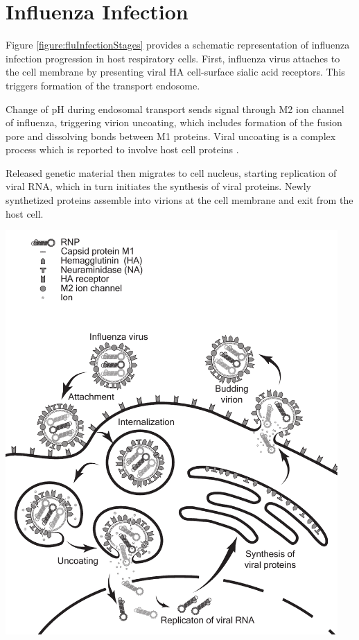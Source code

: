 \section{Influenza Infection}

Figure \ref{figure:fluInfectionStages} provides a schematic representation of influenza infection progression in host respiratory cells. First, influenza virus attaches to the cell membrane by presenting viral HA cell-surface sialic acid receptors. This triggers formation of the transport endosome.

Change of pH during endosomal transport sends signal through M2 ion channel of influenza, triggering virion uncoating, which includes formation of the fusion pore and dissolving bonds between M1 proteins. Viral uncoating is a complex process which is reported to involve host cell proteins \cite{banerjee2014influenza}.

Released genetic material then migrates to cell nucleus, starting replication of viral RNA, which in turn initiates the synthesis of viral proteins. Newly synthetized proteins assemble into virions at the cell membrane and exit from the host cell.

\begin{center}
\includegraphics[width=0.95\textwidth, trim={0cm 0cm 0cm 0cm}, clip]{D_chapters/0_introduction/flu_stages.pdf}
\label{figure:fluInfectionStages}
\end{center}